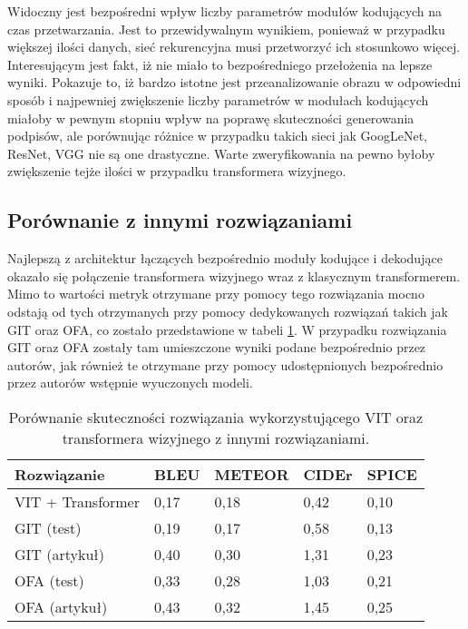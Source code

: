 \noindent Widoczny jest bezpośredni wpływ liczby parametrów modułów kodujących na czas przetwarzania. Jest to przewidywalnym wynikiem, ponieważ w przypadku większej ilości danych, sieć rekurencyjna musi przetworzyć ich stosunkowo więcej. Interesującym jest fakt, iż nie miało to bezpośredniego przełożenia na lepsze wyniki. Pokazuje to, iż bardzo istotne jest przeanalizowanie obrazu w odpowiedni sposób i najpewniej zwiększenie liczby parametrów w modułach kodujących miałoby w pewnym stopniu wpływ na poprawę skuteczności generowania podpisów, ale porównując różnice w przypadku takich sieci jak GoogLeNet, ResNet, VGG nie są one drastyczne. Warte zweryfikowania na pewno byłoby zwiększenie tejże ilości w przypadku transformera wizyjnego.
\subsection{Porównanie z innymi rozwiązaniami}
Najlepszą z architektur łączących bezpośrednio moduły kodujące i dekodujące okazało się połączenie transformera wizyjnego wraz z klasycznym transformerem. Mimo to wartości metryk otrzymane przy pomocy tego rozwiązania mocno odstają od tych otrzymanych przy pomocy dedykowanych rozwiązań takich jak GIT oraz OFA, co zostało przedstawione w tabeli \ref{tab:comparison}. W przypadku rozwiązania GIT oraz OFA zostały tam umieszczone wyniki podane bezpośrednio przez autorów, jak również te otrzymane przy pomocy udostępnionych bezpośrednio przez autorów wstępnie wyuczonych modeli.
\begin{table}[H]
    \centering
    \caption{Porównanie skuteczności rozwiązania wykorzystującego VIT oraz transformera wizyjnego z innymi rozwiązaniami.}
    \label{tab:comparison}
    \begin{tabular}{|l|l|l|l|l|}
        \hline
        \textbf{Rozwiązanie} & \textbf{BLEU} & \textbf{METEOR} & \textbf{CIDEr} & \textbf{SPICE} \\ \hline
        VIT + Transformer    & 0,17          & 0,18            & 0,42           & 0,10           \\ \hline
        GIT (test)           & 0,19          & 0,17            & 0,58           & 0,13           \\ \hline
        GIT (artykuł)        & 0,40          & 0,30            & 1,31           & 0,23           \\ \hline
        OFA (test)           & 0,33          & 0,28            & 1,03           & 0,21           \\ \hline
        OFA  (artykuł)       & 0,43          & 0,32            & 1,45           & 0,25           \\ \hline
    \end{tabular}
\end{table}
